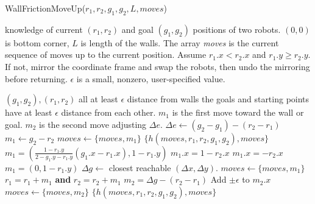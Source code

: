 \begin{algorithm}
\caption{WallFrictionMoveUp($r_1,r_2,g_1,g_2,L, moves$)}\label{alg:Wallup}
\begin{algorithmic}[1]
\Require knowledge of current $(r_1,r_2)$ and goal $(g_1,g_2)$ positions of  two robots. 
$(0,0)$ is bottom corner,
 $L$ is length of the walls. 
 The array \emph{moves} is the current sequence of moves up to the current position.
 Assume $r_1.x < r_2.x$ and $r_1.y \geq r_2.y$. If not, mirror the coordinate frame and swap the robots, then undo the mirroring before returning.
 $\epsilon $ is a small, nonzero, user-specified value.
 
\Ensure $(g_1, g_2) , (r_1, r_2)$ all at least $\epsilon$ distance from walls the goals and starting points have at least $\epsilon$ distance from each other.  
$m_1$ is the first move toward the wall or goal.
 $m_2$ is the second move adjusting $\Delta e$.
\State $\Delta e \gets (g_2 - g_1)- (r_2- r_1)$
 
\State $m_1  \gets g_2 -  r_2$
\State $moves \gets \{ moves,   m_1 \}$
\State \Return $\{h(moves, r_1,r_2,g_1,g_2), moves\}$
\EndIf
{} 
\State $m_1 = \left(\frac{1-r_1.y}{2-g_1.y-r_1.y} (g_1.x -r_1.x), 1-r_1.y \right)$
\State $m_1.x = 1- r_2.x$
\EndIf
{}
\State $m_1.x = -r_2.x$
\EndIf
\Else 
\State $m_1 = (0, 1-r_1.y)$
\State $\Delta g \gets $ closest reachable $(\Delta x,\Delta y)$.
\EndIf
\State $moves \gets \{ moves,   m_1\}$
\State $r_1 = r_1 + m_1$ \textbf{and} $r_2 = r_2 + m_1$
\State $m_2 = \Delta g -  (r_2- r_1)$
\State Add $\pm \epsilon$ to $m_2.x$
\EndIf
\State $moves \gets \{ moves,   m_2\}$
\State \Return $\{h(moves, r_1,r_2,g_1,g_2), moves\}$
\end{algorithmic}
\end{algorithm}





